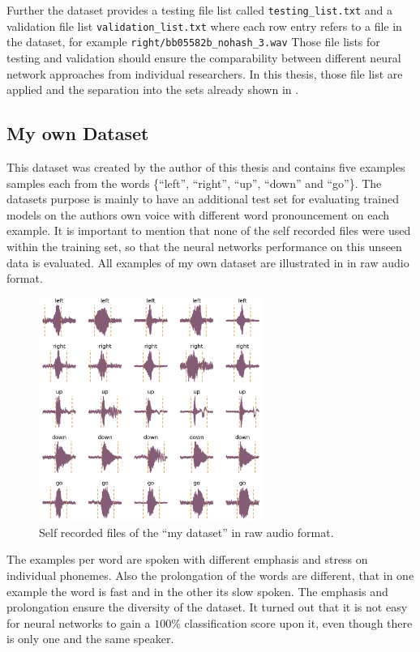 Further the dataset provides a testing file list called \texttt{testing\_list.txt} and a validation file list \texttt{validation\_list.txt} where each row entry refers to a file in the dataset, for example \texttt{right/bb05582b\_nohash\_3.wav}
Those file lists for testing and validation should ensure the comparability between different neural network approaches from individual researchers.
In this thesis, those file list are applied and the separation into the sets already shown in .



\subsection{My own Dataset}\label{sec:exp_dataset_my}
This dataset was created by the author of this thesis and contains five examples samples each from the words \{\enquote{left}, \enquote{right}, \enquote{up}, \enquote{down} and \enquote{go}\}.
The datasets purpose is mainly to have an additional test set for evaluating trained models on the authors own voice with different word pronouncement on each example.
It is important to mention that none of the self recorded files were used within the training set, so that the neural networks performance on this unseen data is evaluated.
All examples of my own dataset are illustrated in  in raw audio format.
\begin{figure}[!ht]
  \centering
    \includegraphics[width=0.65\textwidth]{./5_exp/figs/exp_dataset_wav_grid_my}
  \caption{Self recorded files of the \enquote{my dataset} in raw audio format.}
  \label{fig:exp_dataset_wav_grid_my}
\end{figure}
\FloatBarrier
\noindent
The examples per word are spoken with different emphasis and stress on individual phonemes.
Also the prolongation of the words are different, that in one example the word is fast and in the other its slow spoken.
The emphasis and prolongation ensure the diversity of the dataset. 
It turned out that it is not easy for neural networks to gain a $100\%$ classification score upon it, even though there is only one and the same speaker.


